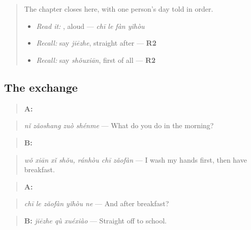 \section[Practice]{ }

\label{lesson:ZH-C278-practice}



\begin{quote}
The chapter closes here, with one person's day told in order.

\begin{itemize}
\raggedright
  \item \emph{Read it:} , aloud — \emph{chī le fàn yǐhòu}
  \item \emph{Recall:} say \emph{jiēzhe}, straight after — \textbf{R2}
  \item \emph{Recall:} say \emph{shǒuxiān}, first of all — \textbf{R2}
\end{itemize}
\end{quote}

\subsection*{The exchange}
\begin{quote}
\textbf{A:} 
\end{quote}

\begin{quote}
\emph{nǐ zǎoshang zuò shénme} — What do you do in the morning?
\end{quote}

\begin{quote}
\textbf{B:}  
\end{quote}

\begin{quote}
\emph{wǒ xiān xǐ shǒu, ránhòu chī zǎofàn} — I wash my hands first, then have breakfast.
\end{quote}

\begin{quote}
\textbf{A:} 
\end{quote}

\begin{quote}
\emph{chī le zǎofàn yǐhòu ne} — And after breakfast?
\end{quote}

\begin{quote}
\textbf{B:} \emph{jiēzhe qù xuéxiào} — Straight off to school.
\end{quote}

